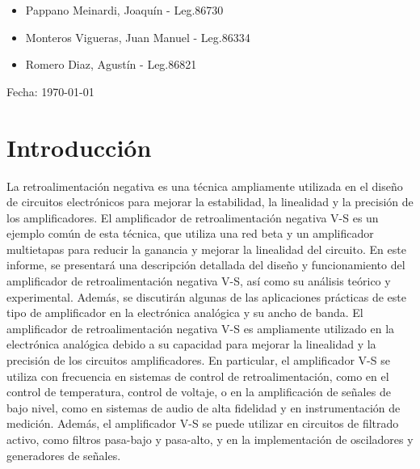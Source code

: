 \documentclass[12pt, letterpaper]{article}
\begin{document}
\begin{titlepage}
            \begin{itemize}
                \item{\Large Pappano Meinardi, Joaquín - Leg.86730\par}
                \item{\Large Monteros Vigueras, Juan Manuel - Leg.86334\par}
                \item{\Large Romero Diaz, Agustín - Leg.86821\par}
            \end{itemize}
        \vspace{0.5cm}
        {\Large Fecha: {\today} \par}%
    \end{titlepage}

\newpage
\tableofcontents
\newpage

\section{Introducción}

La retroalimentación negativa es una técnica ampliamente utilizada en el diseño de circuitos electrónicos para mejorar la estabilidad, la linealidad y la precisión de los amplificadores.
 El amplificador de retroalimentación negativa V-S es un ejemplo común de esta técnica, que utiliza una red beta y un amplificador multietapas para reducir la ganancia y mejorar la linealidad del circuito.
En este informe, se presentará una descripción detallada del diseño y funcionamiento del amplificador de retroalimentación negativa V-S, así como su análisis teórico y experimental.
Además, se discutirán algunas de las aplicaciones prácticas de este tipo de amplificador en la electrónica analógica y su ancho de banda.
\singlespacing
El amplificador de retroalimentación negativa V-S es ampliamente utilizado en la electrónica analógica debido a su capacidad para mejorar la linealidad y la precisión de los circuitos amplificadores. 
En particular, el amplificador V-S se utiliza con frecuencia en sistemas de control de retroalimentación, como en el control de temperatura, control de voltaje, o en la amplificación de señales de bajo nivel, como en sistemas de audio de alta fidelidad y en instrumentación de medición.
\singlespacing
Además, el amplificador V-S se puede utilizar en circuitos de filtrado activo, como filtros pasa-bajo y pasa-alto, y en la implementación de osciladores y generadores de señales.
\end{document}
